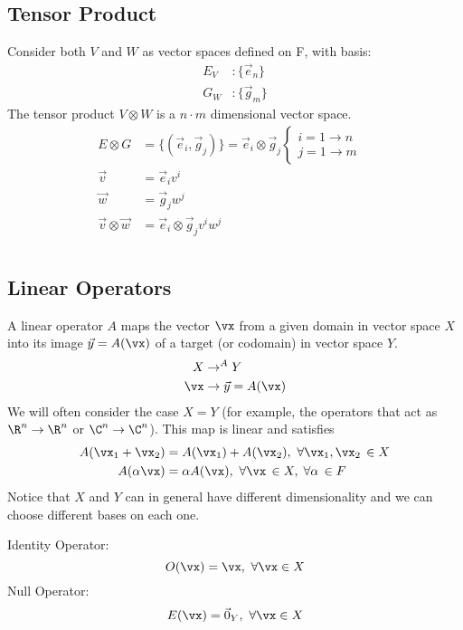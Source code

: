 \documentclass[cplx.tex]{subfiles}
\begin{document}
\section{Tensor Product}
Consider both $V$ and $W$ as vector spaces defined on F, with basis:
\begin{align}
    E_V &: \{\vec{e}_n\} \\
    G_W &: \{\vec{g}_m\}
\end{align}
The tensor product $V\otimes W$ is a $n\cdot m$ dimensional vector space.
\begin{align}
    E\otimes G &= \{(\vec{e}_i,\vec{g}_j)\} = \vec{e}_i\otimes \vec{g}_j \begin{cases} i = 1\to n & \\ j = 1 \to m & \end{cases} \\
    \vec{v} &= \vec{e}_iv^i \\
    \vec{w} &= \vec{g}_jw^j \\
    \vec{v}\otimes \vec{w} &= \vec{e}_i\otimes \vec{g}_jv^iw^j 
\end{align}

\chapter{}

\section{Linear Operators}
A linear operator $A$ maps the vector $\vx$ from a given domain in vector space $X$ into its image $\vec{y} = A(\vx)$ of a target (or codomain) in vector space $Y$.
\begin{align}
    X &\rightarrow^A Y \\
    \vx &\rightarrow \vec{y} = A(\vx)
\end{align}
We will often consider the case $X=Y$ (for example, the operators that act as $\R^n \to \R^n$ or $\C^n \to \C^n$). This map is linear and satisfies
\begin{align}
    A(\vx_1 + \vx_2) &= A(\vx_1) + A(\vx_2),~ \forall \vx_1,\vx_2 \,\in X \\
    A(\alpha\vx) &= \alpha A(\vx),~ \forall \vx \,\in X, \;\forall \alpha \,\in F
\end{align}
Notice that $X$ and $Y$ can in general have different dimensionality and we can choose different bases on each one. 

\begin{example}
Identity Operator:
\begin{equation}
    O(\vx) = \vx,~ \forall \vx \in X 
\end{equation}
Null Operator:
\begin{equation}
    E(\vx) = \vec{0}_Y,~ \forall \vx \in X
\end{equation}
\end{example}
\end{document}
